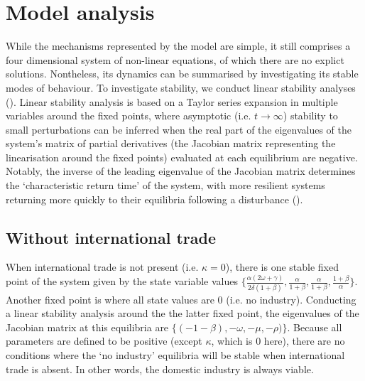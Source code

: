 \documentclass[12pt]{article}
\begin{document}
\section{Model analysis}
While the mechanisms represented by the model are simple, it still comprises a four dimensional system of non-linear equations, of which there are no explict solutions. Nontheless, its dynamics can be summarised by investigating its stable modes of behaviour. To investigate stability, we conduct linear stability analyses (\cite{strogatz1994}). Linear stability analysis is based on a Taylor series expansion in multiple variables around the fixed points, where asymptotic (i.e. $t \rightarrow \infty$) stability to small perturbations can be inferred when the real part of the eigenvalues of the system's matrix of partial derivatives (the Jacobian matrix representing the linearisation around the fixed points) evaluated at each equilibrium are negative. Notably, the inverse of the leading eigenvalue of the Jacobian matrix determines the `characteristic return time' of the system, with more resilient systems returning more quickly to their equilibria following a disturbance (\cite{pimm1984}).

\subsection{Without international trade}
When international trade is not present (i.e. $\kappa = 0$), there is one stable fixed point of the system given by the state variable values $\big \{\frac{\alpha(2\omega + \gamma)}{2 \delta (1 + \beta)}, \frac{\alpha}{1 + \beta}, \frac{\alpha}{1 + \beta}, \frac{1 + \beta}{\alpha}\big\}$. Another fixed point is where all state values are 0 (i.e. no industry). Conducting a linear stability analysis around the the latter fixed point, the eigenvalues of the Jacobian matrix at this equilibria are $\{(-1 - \beta), - \omega, - \mu, - \rho)\}$.
Because all parameters are defined to be positive (except $\kappa$, which is $0$ here), there are no conditions where the `no industry' equilibria will be stable when international trade is absent. In other words, the domestic industry is always viable.

\iffalse
The Jacbobian matrix ($\boldsymbol{J}$) at this equilibria evalutes to:

\begin{equation}
  \boldsymbol{J} \Big |_{\{\frac{\alpha(2\omega + \gamma)}{2 \delta (1 + \beta)}, \frac{\alpha}{1 + \beta}, \frac{\alpha}{1 + \beta}, \frac{1 + \beta}{\alpha}\}} =
  \begin{pmatrix}
    0   &    0     &  0 &  \frac{\alpha^2(2 \omega + \gamma)}{2 \delta (1 + \beta)} \\
    \delta & - \omega - \frac{\gamma}{4}  &  - \frac{\gamma}{4} & 0 \\
    0      &           0            & -\mu     & - \mu (\frac{\alpha}{1+\beta})^2\\
    0      &   - \rho (\frac{1 + \beta}{\alpha})^2    & \rho (\frac{1+\beta}{\alpha})^2 & 0 \\
  \end{pmatrix}
\end{equation}
\fi
\end{document}
